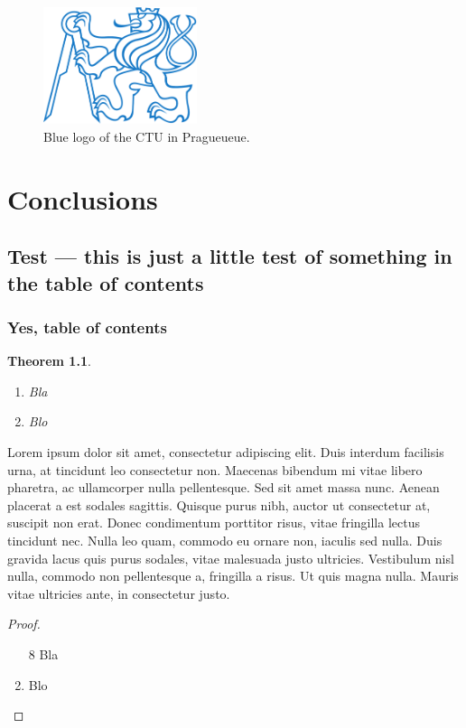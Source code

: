 \documentclass[twoside]{ctuthesis}
\theoremstyle{plain}
\newtheorem{theorem}{Theorem}[chapter]
\theoremstyle{definition}
\theoremstyle{note}
\begin{document}
\begin{figure}[!t]
	\includegraphics[width=0.4\textwidth]{ctu_logo_blue}
	\caption{Blue logo of the CTU in Pragueueue.}
\end{figure}

\chapter{Conclusions}

\section{Test --- this is just a little test of something in the table of contents}

\subsection{Yes, table of contents}

\begin{theorem}\begin{enumerate} \item Bla \item Blo \end{enumerate} \end{theorem}


Lorem ipsum dolor sit amet, consectetur adipiscing elit. Duis interdum facilisis urna, at tincidunt leo consectetur non. Maecenas bibendum mi vitae libero pharetra, ac ullamcorper nulla pellentesque. Sed sit amet massa nunc. Aenean placerat a est sodales sagittis. Quisque purus nibh, auctor ut consectetur at, suscipit non erat. Donec condimentum porttitor risus, vitae fringilla lectus tincidunt nec. Nulla leo quam, commodo eu ornare non, iaculis sed nulla. Duis gravida lacus quis purus sodales, vitae malesuada justo ultricies. Vestibulum nisl nulla, commodo non pellentesque a, fringilla a risus. Ut quis magna nulla. Mauris vitae ultricies ante, in consectetur justo.

\medskip

\begin{proof}\begin{enumerate} \item[8] Bla \item Blo \end{enumerate} \end{proof}

\appendix

\printindex

\appendix




\end{document}
